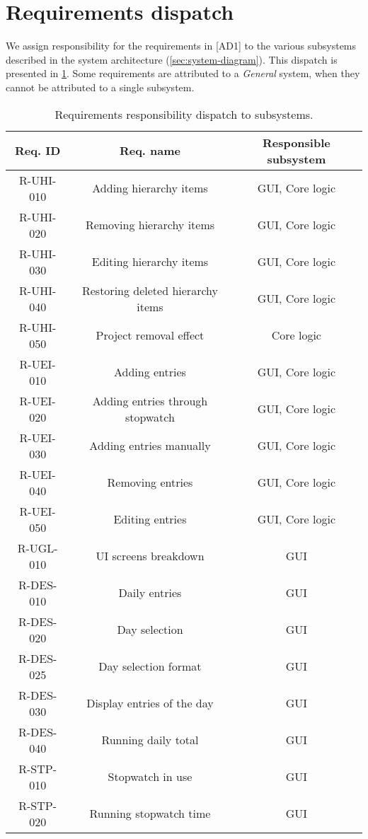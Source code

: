 \section{Requirements dispatch}
We assign responsibility for the requirements in [AD1] to the various subsystems
described in the system architecture (\cref{sec:system-diagram}). This dispatch
is presented in \cref{tab:req-dispatch}. Some requirements are attributed
to a \emph{General} system, when they cannot be attributed to a single
subsystem.

\begin{longtable}{| c | c | c |}
  \caption{\label{tab:req-dispatch} Requirements responsibility dispatch to
    subsystems.} \\ \hline
  \textbf{Req. ID} & \textbf{Req. name} & \textbf{Responsible subsystem} \\ \hline
  R-UHI-010 & Adding hierarchy items & GUI, Core logic \\ \hline
  R-UHI-020 & Removing hierarchy items & GUI, Core logic \\ \hline
  R-UHI-030 & Editing hierarchy items & GUI, Core logic \\ \hline
  R-UHI-040 & Restoring deleted hierarchy items & GUI, Core logic \\ \hline
  R-UHI-050 & Project removal effect & Core logic \\ \hline
  R-UEI-010 & Adding entries & GUI, Core logic \\ \hline
  R-UEI-020 & Adding entries through stopwatch & GUI, Core logic \\ \hline
  R-UEI-030 & Adding entries manually & GUI, Core logic \\ \hline
  R-UEI-040 & Removing entries & GUI, Core logic \\ \hline
  R-UEI-050 & Editing entries & GUI, Core logic \\ \hline
  R-UGL-010 & UI screens breakdown & GUI \\ \hline
  R-DES-010 & Daily entries & GUI \\ \hline
  R-DES-020 & Day selection & GUI \\ \hline
  R-DES-025 & Day selection format & GUI \\ \hline
  R-DES-030 & Display entries of the day & GUI \\ \hline
  R-DES-040 & Running daily total & GUI \\ \hline
  R-STP-010 & Stopwatch in use & GUI \\ \hline
  R-STP-020 & Running stopwatch time & GUI \\ \hline

\end{longtable}
